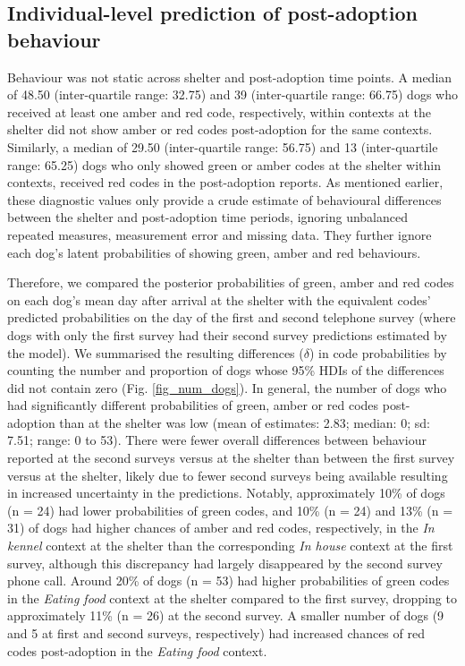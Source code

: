 \documentclass[12pt]{article}
\begin{document}
\subsection{Individual-level prediction of post-adoption behaviour}
Behaviour was not static across shelter and post-adoption time points. A median of 48.50 (inter-quartile range: 32.75) and 39 (inter-quartile range: 66.75) dogs who received at least one amber and red code, respectively, within contexts at the shelter did not show amber or red codes post-adoption for the same contexts. Similarly, a median of 29.50 (inter-quartile range: 56.75) and 13 (inter-quartile range: 65.25) dogs who only showed green or amber codes at the shelter within contexts, received red codes in the post-adoption reports. As mentioned earlier, these diagnostic values only provide a crude estimate of behavioural differences between the shelter and post-adoption time periods, ignoring unbalanced repeated measures, measurement error and missing data. They further ignore each dog's latent probabilities of showing green, amber and red behaviours.

Therefore, we compared the posterior probabilities of green, amber and red codes on each dog's mean day after arrival at the shelter with the equivalent codes' predicted probabilities on the day of the first and second telephone survey (where dogs with only the first survey had their second survey predictions estimated by the model). We summarised the resulting differences ($\delta$) in code probabilities by counting the number and proportion of dogs whose 95\% HDIs of the differences did not contain zero (Fig. \ref{fig_num_dogs}). In general, the number of dogs who had significantly different probabilities of green, amber or red codes post-adoption than at the shelter was low (mean of estimates: 2.83; median: 0; sd: 7.51; range: 0 to 53). There were fewer overall differences between behaviour reported at the second surveys versus at the shelter than between the first survey versus at the shelter, likely due to fewer second surveys being available resulting in increased uncertainty in the predictions. Notably, approximately 10\% of dogs (n = 24) had lower probabilities of green codes, and 10\% (n = 24) and 13\% (n = 31) of dogs had higher chances of amber and red codes, respectively, in the \textit{In kennel} context at the shelter than the corresponding \textit{In house} context at the first survey, although this discrepancy had largely disappeared by the second survey phone call. Around 20\% of dogs (n = 53) had higher probabilities of green codes in the \textit{Eating food} context at the shelter compared to the first survey, dropping to approximately 11\% (n = 26) at the second survey. A smaller number of dogs (9 and 5 at first and second surveys, respectively) had increased chances of red codes post-adoption in the \textit{Eating food} context.
\end{document}
